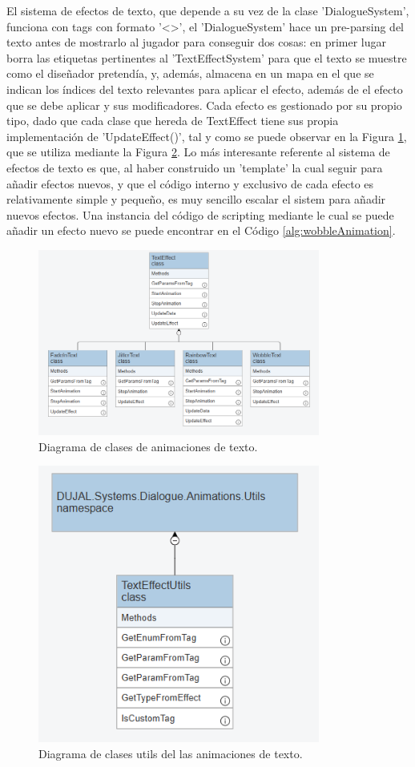 El sistema de efectos de texto, que depende a su vez de la clase 'DialogueSystem', funciona con tags con formato '<>', el 'DialogueSystem' hace un pre-parsing del texto antes de mostrarlo al jugador para conseguir dos cosas:
en primer lugar borra las etiquetas pertinentes al 'TextEffectSystem' para que el texto se muestre como el diseñador pretendía, y, además, almacena en un mapa en el que se indican los índices del texto relevantes para aplicar 
el efecto, además de el efecto que se debe aplicar y sus modificadores. Cada efecto es gestionado por su propio tipo, dado que cada clase que hereda de TextEffect tiene sus propia implementación de 'UpdateEffect()',
tal y como se puede observar en la Figura \ref{fig:dialogueUml3}, que se utiliza mediante la Figura \ref{fig:dialogueUml4}. Lo más interesante referente al sistema de efectos de texto es que, al haber construido un
'template' la cual seguir para añadir efectos nuevos, y que el código interno y exclusivo de cada efecto es relativamente simple y pequeño, es muy sencillo escalar el sistem para añadir nuevos efectos. Una instancia
 del código de scripting mediante le cual se puede añadir un efecto nuevo se puede encontrar en el Código \ref{alg:wobbleAnimation}.

\begin{figure}[H]
  \centering
    \includegraphics[width=350px,clip=true]{Text_Effects.png}
  \caption{Diagrama de clases de animaciones de texto.}
  \label{fig:dialogueUml3}
\end{figure}


\begin{figure}[H]
  \centering
    \includegraphics[width=350px,clip=true]{Text_Effect_Utils.png}
  \caption{Diagrama de clases utils del las animaciones de texto.}
  \label{fig:dialogueUml4}
\end{figure}

